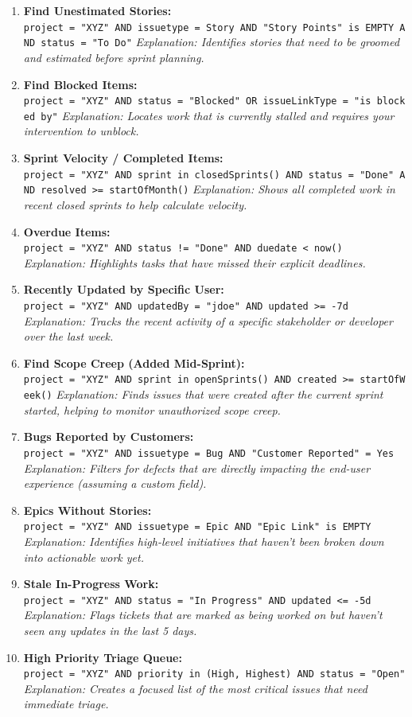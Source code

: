 \begin{enumerate}
\def\labelenumi{\arabic{enumi}.}
\item
  \textbf{Find Unestimated Stories:}
  \texttt{project\ =\ "XYZ"\ AND\ issuetype\ =\ Story\ AND\ "Story\ Points"\ is\ EMPTY\ AND\ status\ =\ "To\ Do"}
  \emph{Explanation: Identifies stories that need to be groomed and
  estimated before sprint planning.}
\item
  \textbf{Find Blocked Items:}
  \texttt{project\ =\ "XYZ"\ AND\ status\ =\ "Blocked"\ OR\ issueLinkType\ =\ "is\ blocked\ by"}
  \emph{Explanation: Locates work that is currently stalled and requires
  your intervention to unblock.}
\item
  \textbf{Sprint Velocity / Completed Items:}
  \texttt{project\ =\ "XYZ"\ AND\ sprint\ in\ closedSprints()\ AND\ status\ =\ "Done"\ AND\ resolved\ \textgreater{}=\ startOfMonth()}
  \emph{Explanation: Shows all completed work in recent closed sprints
  to help calculate velocity.}
\item
  \textbf{Overdue Items:}
  \texttt{project\ =\ "XYZ"\ AND\ status\ !=\ "Done"\ AND\ duedate\ \textless{}\ now()}
  \emph{Explanation: Highlights tasks that have missed their explicit
  deadlines.}
\item
  \textbf{Recently Updated by Specific User:}
  \texttt{project\ =\ "XYZ"\ AND\ updatedBy\ =\ "jdoe"\ AND\ updated\ \textgreater{}=\ -7d}
  \emph{Explanation: Tracks the recent activity of a specific
  stakeholder or developer over the last week.}
\item
  \textbf{Find Scope Creep (Added Mid-Sprint):}
  \texttt{project\ =\ "XYZ"\ AND\ sprint\ in\ openSprints()\ AND\ created\ \textgreater{}=\ startOfWeek()}
  \emph{Explanation: Finds issues that were created after the current
  sprint started, helping to monitor unauthorized scope creep.}
\item
  \textbf{Bugs Reported by Customers:}
  \texttt{project\ =\ "XYZ"\ AND\ issuetype\ =\ Bug\ AND\ "Customer\ Reported"\ =\ Yes}
  \emph{Explanation: Filters for defects that are directly impacting the
  end-user experience (assuming a custom field).}
\item
  \textbf{Epics Without Stories:}
  \texttt{project\ =\ "XYZ"\ AND\ issuetype\ =\ Epic\ AND\ "Epic\ Link"\ is\ EMPTY}
  \emph{Explanation: Identifies high-level initiatives that haven't been
  broken down into actionable work yet.}
\item
  \textbf{Stale In-Progress Work:}
  \texttt{project\ =\ "XYZ"\ AND\ status\ =\ "In\ Progress"\ AND\ updated\ \textless{}=\ -5d}
  \emph{Explanation: Flags tickets that are marked as being worked on
  but haven't seen any updates in the last 5 days.}
\item
  \textbf{High Priority Triage Queue:}
  \texttt{project\ =\ "XYZ"\ AND\ priority\ in\ (High,\ Highest)\ AND\ status\ =\ "Open"}
  \emph{Explanation: Creates a focused list of the most critical issues
  that need immediate triage.}
\end{enumerate}

